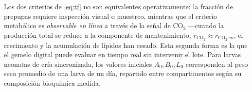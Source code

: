 \begin{remark}\label{rem:tf}
Los dos criterios de \eqref{eq:tf} no son equivalentes operativamente: la
fracción de prepupas requiere inspección visual o muestreo, mientras que el
criterio metabólico es \emph{observable en línea} a través de la señal de
CO$_2$ ---cuando la producción total se reduce a la componente de
mantenimiento, $r_{\mathrm{CO_2}} \approx r_{\mathrm{CO_2},m}$, el
crecimiento y la acumulación de lípidos han cesado. Esta segunda forma es la
que el gemelo digital puede evaluar en tiempo real sin intervenir el lote.
Para larvas neonatas de cría sincronizada, los valores iniciales
$A_0, B_0, L_0$ corresponden al peso seco promedio de una larva de un día,
repartido entre compartimentos según su composición bioquímica medida.
\end{remark}